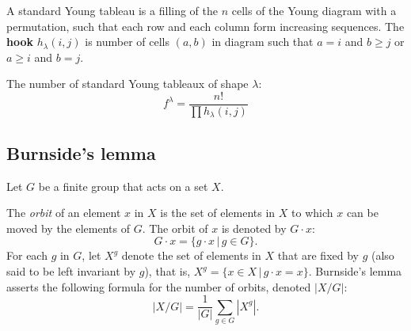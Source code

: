 A standard Young tableau is a filling of the $n$ cells of the Young diagram with a permutation, 
such that each row and each column form increasing sequences. 
The \textbf{hook} $h_{\lambda}(i, j)$ is number of cells $(a, b)$ in diagram such that
$a = i$ and $b \ge j$ or $a \ge i$ and $b = j$.

The number of standard Young tableaux of shape $\lambda$:
$$f^\lambda = \frac{n!}{\prod h_{\lambda}(i, j)}$$


\subsection*{Burnside's lemma}

Let $G$ be a finite group that acts on a set $X$.

The \textit{orbit} of an element $x$ in $X$ is the set of elements
in $X$ to which $x$ can be moved by the elements of $G$.
The orbit of $x$ is denoted by $G \cdot x$:
 $$G \cdot x = \{g \cdot x\, |\, g \in G\}.$$
For each $g$ in $G$, let $X^g$ denote the set of elements
in $X$ that are fixed by $g$ (also said to be left invariant by $g$),
that is, $X^g = \{ x \in X\, |\, g \cdot x = x \}$.
Burnside's lemma asserts the following formula for the number of orbits,
denoted $|X/G|$:
$$|X/G| = \frac{1}{|G|} \sum_{g \in G} |X^g|.$$
